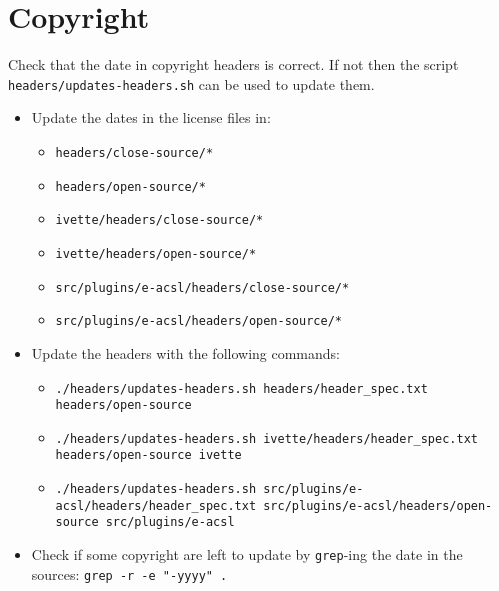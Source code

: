 
\section{Copyright}

Check that the date in copyright headers is correct. If not then the script
\texttt{headers/updates-headers.sh} can be used to update them.

\begin{itemize}
  \item Update the dates in the license files in:
  \begin{itemize}
    \item \texttt{headers/close-source/*}
    \item \texttt{headers/open-source/*}
    \item \texttt{ivette/headers/close-source/*}
    \item \texttt{ivette/headers/open-source/*}
    \item \texttt{src/plugins/e-acsl/headers/close-source/*}
    \item \texttt{src/plugins/e-acsl/headers/open-source/*}
  \end{itemize}
  \item Update the headers with the following commands:
  \begin{itemize}
    \item \texttt{./headers/updates-headers.sh headers/header\_spec.txt headers/open-source}
    \item \texttt{./headers/updates-headers.sh ivette/headers/header\_spec.txt headers/open-source ivette}
    \item \texttt{./headers/updates-headers.sh src/plugins/e-acsl/headers/header\_spec.txt src/plugins/e-acsl/headers/open-source src/plugins/e-acsl}
  \end{itemize}
  \item Check if some copyright are left to update by \texttt{grep}-ing the date in the sources: \texttt{grep -r -e "-yyyy" .}
\end{itemize}

